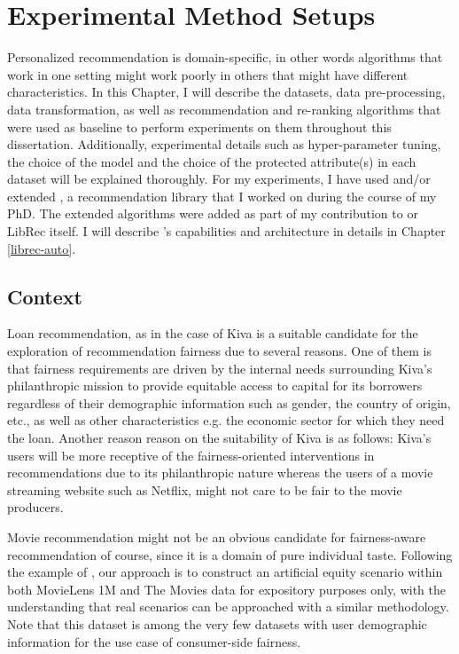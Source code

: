 \chapter{Experimental Method Setups}
\label{chap:methodology}


Personalized recommendation is domain-specific, in other words algorithms that work in one setting might work poorly in others that might have different characteristics. \cite{}
In this Chapter, I will describe the datasets, data pre-processing, data transformation, as well as recommendation and re-ranking algorithms that were used as baseline to perform experiments on them throughout this dissertation. 
Additionally, experimental details such as hyper-parameter tuning, the choice of the model and the choice of the protected attribute(s) in each dataset will be explained thoroughly. For my experiments, I have used and/or extended \libauto{}, a recommendation library that I worked on during the course of my PhD. The extended algorithms were added as part of my contribution to \libauto{} or LibRec itself. I will describe \libauto{}'s capabilities and architecture in details in Chapter \ref{librec-auto}.


\section{Context}


Loan recommendation, as in the case of Kiva is a suitable candidate for the exploration of recommendation fairness due to several reasons. One of them is that fairness requirements are driven by the internal needs surrounding Kiva's philanthropic mission to provide equitable access to capital for its borrowers regardless of their demographic information such as gender, the country of origin, etc., as well as other characteristics e.g. the economic sector for which they need the loan. Another reason reason on the suitability of Kiva is as follows: Kiva's users will be more receptive of the fairness-oriented interventions in recommendations due to its philanthropic nature whereas the users of a movie streaming website such as Netflix, might not care to be fair to the movie producers. 

Movie recommendation might not be an obvious candidate for fairness-aware recommendation of course, since it is a domain of pure individual taste. Following the example of \cite{yao2017beyond}, our approach is to construct an artificial equity scenario within both MovieLens 1M and The Movies data for expository purposes only, with the understanding that real scenarios can be approached with a similar methodology. Note that this dataset is among the very few datasets with user demographic information for the use case of consumer-side fairness.

